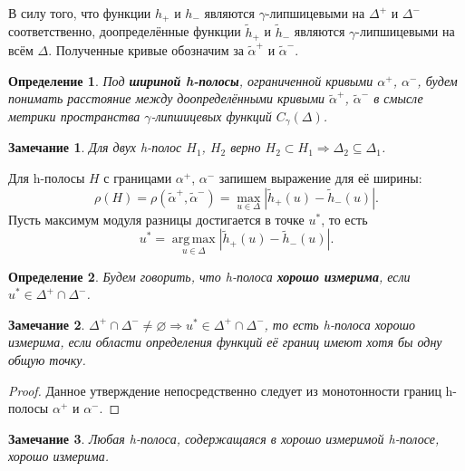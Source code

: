 \documentclass{article}
\newtheorem*{definition}{Определение}
\newtheorem{remark}{Замечание}
\DeclareMathOperator*{\argmax}{arg\,max}
\begin{document}
В силу того, что функции $h_+$ и $h_-$ являются $\gamma$-липшицевыми на $\Delta^+$ и $\Delta^-$ соответственно, доопределённые функции $\widetilde{h}_+$ и $\widetilde{h}_-$ являются $\gamma$-липшицевыми на всём $\Delta$.
Полученные кривые обозначим за $\widetilde{\alpha}^+$ и $\widetilde{\alpha}^-$.

\begin{definition}
	Под {\bf шириной h-полосы}, ограниченной кривыми $\alpha^+$, $\alpha^-$, будем понимать расстояние между доопределёнными кривыми $\widetilde{\alpha}^+$, $\widetilde{\alpha}^-$ в смысле метрики пространства $\gamma$-липшицевых функций $C_{\gamma}(\Delta)$.
\end{definition}

\begin{remark}
 	Для двух h-полос $H_1$, $H_2$ верно $H_2 \subset H_1 \Rightarrow \Delta_2 \subseteq \Delta_1$.
\label{rem:h-strips}
\end{remark}

Для h-полосы $H$ с границами $\alpha^+$, $\alpha^-$ запишем выражение для её ширины:
\begin{equation}
	\rho(H) = \rho(\widetilde{\alpha}^+, \widetilde{\alpha}^-) = \max \limits_{u \in \Delta} |\widetilde{h}_+(u) - \widetilde{h}_-(u)|.
\label{eq:width-h-strip}
\end{equation}
Пусть максимум модуля разницы достигается в точке $u^*$, то есть
\begin{equation}
	u^* = \argmax \limits_{u \in \Delta} |\widetilde{h}_+(u) - \widetilde{h}_-(u)|.
\label{eq:argmax}
\end{equation}

\begin{definition}
	Будем говорить, что \emph{h}-полоса {\bf хорошо измерима}, если $u^* \in \Delta^+ \cap \Delta^-$.	
\end{definition}

\begin{remark}
	$\Delta^+ \cap \Delta^- \neq \varnothing \Rightarrow u^* \in \Delta^+ \cap \Delta^-$, то есть \emph{h}-полоса хорошо измерима, если области определения функций её границ имеют хотя бы одну общую точку.
\end{remark}
\begin{proof}
	Данное утверждение непосредственно следует из монотонности границ h-полосы $\alpha^+$ и $\alpha^-$.
\end{proof}

\begin{remark}
	Любая \emph{h}-полоса, содержащаяся в хорошо измеримой \emph{h}-полосе, хорошо измерима.
\label{rem:well-h-strip}
\end{remark}
\end{document}
